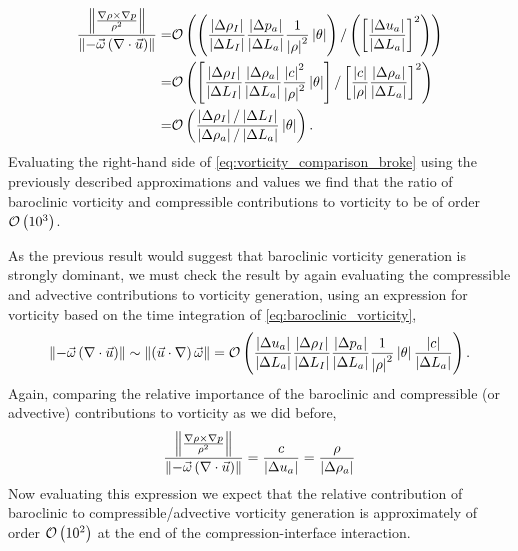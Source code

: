 \begin{align} \label{eq:vorticity_comparison_broke}
\frac{\norm{\frac{\nabla\rho\times\nabla p}{\rho^2}}}{\norm{-\vec{\omega}\left(\nabla\cdot\vec{u}\right)}} =&%
\orderof{\left(\frac{\abs{\Delta \rho_I}}{\abs{\Delta L_I}}\frac{\abs{\Delta p_a}}{\abs{\Delta L_a}}\frac{1}{\abs{\rho}^2}\abs{\theta}\right) /%
\left( \left[\frac{\abs{\Delta u_a}}{\abs{\Delta L_a}}\right]^2 \right)}\nonumber\\%
%
=&\orderof{\left[\frac{\abs{\Delta \rho_I}}{\abs{\Delta L_I}}\frac{\abs{\Delta \rho_a}}{\abs{\Delta L_a}}\frac{\abs{c}^2}{\abs{\rho}^2}\abs{\theta}\right] /
\left[\frac{\abs{c}}{\abs{\rho}}\frac{\abs{\Delta \rho_a}}{\abs{\Delta L_a}}\right]^2}\nonumber\\%
%
=&\orderof{\frac{\abs{\Delta \rho_I}/\abs{\Delta L_I}}{\abs{\Delta \rho_a}/\abs{\Delta L_a}} \abs{\theta} }.
\end{align}
Evaluating the right-hand side of
\eqref{eq:vorticity_comparison_broke} using the previously described
approximations and values we find that the ratio of baroclinic
vorticity and compressible contributions to vorticity to be of order
$\mathcal{O}\left(10^3\right)$.

As the previous result would suggest that baroclinic vorticity
generation is strongly dominant, we must check the result by again
evaluating the compressible and advective contributions to vorticity
generation, using an expression for vorticity based on the time
integration of \eqref{eq:baroclinic_vorticity},
\begin{align}
  \label{eq:compressible_advective_vorticity}%
\norm{-\vec{\omega}\left(\nabla\cdot\vec{u}\right)}\sim \norm{\left(\vec{u}\cdot\nabla\right)\vec{\omega}} = %
\orderof{\frac{\abs{\Delta u_a}}{\abs{\Delta L_a}} \frac{\abs{\Delta \rho_I}}{\abs{\Delta L_I}}\frac{\abs{\Delta p_a}}{\abs{\Delta L_a}}\frac{1}{\abs{\rho}^2}\abs{\theta}\frac{\abs{c}}{\abs{\Delta L_a}}}.%
\end{align}
%
Again, comparing the relative importance of the baroclinic and
compressible (or advective) contributions to vorticity as we did before,
\begin{align} \label{eq:vorticity_comparison}
\frac{\norm{\frac{\nabla\rho\times\nabla p}{\rho^2}}}{\norm{-\vec{\omega}\left(\nabla\cdot\vec{u}\right)}} = \frac{c}{\abs{\Delta u_a}} = \frac{\rho}{\abs{\Delta \rho_a}}%
\end{align}
Now evaluating this expression we expect that the relative contribution of
baroclinic to compressible/advective vorticity generation is
approximately of order $\mathcal{O}\left(10^2\right)$ at the end of the
compression-interface interaction.

